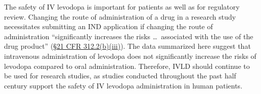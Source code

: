 The safety of IV levodopa is important for patients as well as for regulatory review.  Changing the route of administration of a drug in a research study necessitates submitting an IND application if changing the route of administration “significantly increases the risks \dots\, associated with the use of the drug product” (\href{http://www.accessdata.fda.gov/scripts/cdrh/cfdocs/cfcfr/CFRSearch.cfm?fr=312.2}{\S 21 CFR 312.2(b)(iii)}).  The data summarized here suggest that intravenous administration of levodopa does not significantly increase the risks of levodopa compared to oral administration.  Therefore, IVLD should continue to be used for research studies, as studies conducted throughout the past half century support the safety of IV levodopa administration in human patients.